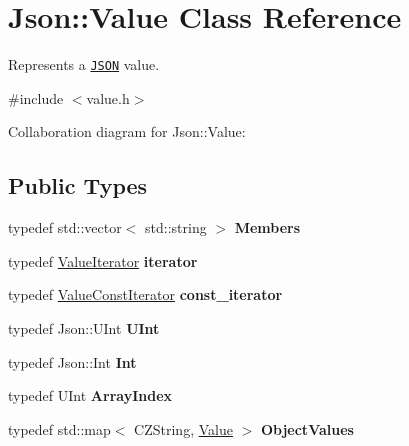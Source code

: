 \hypertarget{class_json_1_1_value}{\section{Json\+:\+:Value Class Reference}
\label{class_json_1_1_value}
}


Represents a \href{http://www.json.org}{\tt J\+S\+O\+N} value.  




{\ttfamily \#include $<$value.\+h$>$}



Collaboration diagram for Json\+:\+:Value\+:
\subsection*{Public Types}
\begin{DoxyCompactItemize}
\item 
\hypertarget{class_json_1_1_value_ac61bab5a465848b57610379cc07995c3}{typedef std\+::vector$<$ std\+::string $>$ {\bfseries Members}}\label{class_json_1_1_value_ac61bab5a465848b57610379cc07995c3}

\item 
\hypertarget{class_json_1_1_value_a341cdf2e01f8b3c5b7317aa2f0768c53}{typedef \hyperlink{class_json_1_1_value_iterator}{Value\+Iterator} {\bfseries iterator}}\label{class_json_1_1_value_a341cdf2e01f8b3c5b7317aa2f0768c53}

\item 
\hypertarget{class_json_1_1_value_af92282ca92b58b320debd486afb7696a}{typedef \hyperlink{class_json_1_1_value_const_iterator}{Value\+Const\+Iterator} {\bfseries const\+\_\+iterator}}\label{class_json_1_1_value_af92282ca92b58b320debd486afb7696a}

\item 
\hypertarget{class_json_1_1_value_a0933d59b45793ae4aade1757c322a98d}{typedef Json\+::\+U\+Int {\bfseries U\+Int}}\label{class_json_1_1_value_a0933d59b45793ae4aade1757c322a98d}

\item 
\hypertarget{class_json_1_1_value_abdf7a7ff73eb130ffcab28504ffdb405}{typedef Json\+::\+Int {\bfseries Int}}\label{class_json_1_1_value_abdf7a7ff73eb130ffcab28504ffdb405}

\item 
\hypertarget{class_json_1_1_value_a5b1b5f0fbe81bec133b054419a6273cd}{typedef U\+Int {\bfseries Array\+Index}}\label{class_json_1_1_value_a5b1b5f0fbe81bec133b054419a6273cd}

\item 
\hypertarget{class_json_1_1_value_a08b6c80c3af7071d908dabf044de5388}{typedef std\+::map$<$ C\+Z\+String, \hyperlink{class_json_1_1_value}{Value} $>$ {\bfseries Object\+Values}}\label{class_json_1_1_value_a08b6c80c3af7071d908dabf044de5388}

\end{DoxyCompactItemize}
